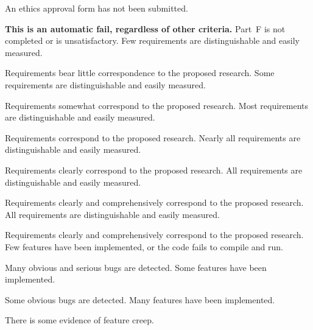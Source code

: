 \rubricyearthree
{}
\begin{markingrubric}
		\grade\fail An ethics approval form has not been submitted.
			\par \textbf{This is an automatic fail, regardless of other criteria.}
		\grade\fail Part~F is not completed or is unsatisfactory.
        \grade \fail Few requirements are distinguishable and easily measured.
            \par Requirements bear little correspondence to the proposed research.
        \grade Some requirements are distinguishable and easily measured.
            \par Requirements somewhat correspond to the proposed research.
        \grade Most requirements are distinguishable and easily measured.
            \par Requirements correspond to the proposed research.
        \grade Nearly all requirements are distinguishable and easily measured.
            \par Requirements clearly correspond to the proposed research.
        \grade All requirements are distinguishable and easily measured.
            \par Requirements clearly and comprehensively correspond to the proposed research.
        \grade All requirements are distinguishable and easily measured.
            \par Requirements clearly and comprehensively correspond to the proposed research.
%
        \grade \fail Few features have been implemented, or the code fails to compile and run.
            \par Many obvious and serious bugs are detected.
        \grade Some features have been implemented.
            \par Some obvious bugs are detected.
        \grade Many features have been implemented.
            \par There is some evidence of feature creep.

\end{markingrubric}
